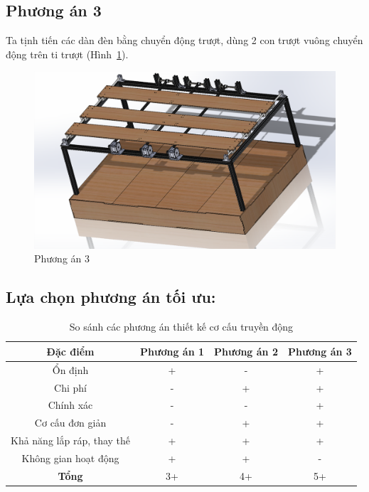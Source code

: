 \subsection{Phương án 3}
Ta tịnh tiến các dàn đèn bằng chuyển động trượt, dùng 2 con trượt vuông chuyển động trên ti trượt (Hình~\ref{fig:phuongan3}). 
\begin{center}
    \begin{figure}[htp]
    \begin{center}
     \includegraphics[scale=1]{Chapters/Chapter3/Images/Phuongan3}
    \end{center}
    \caption{Phương án 3}
    \label{fig:phuongan3}
    \end{figure}
\end{center}

\subsection{Lựa chọn phương án tối ưu:}

\begin{table}[H]
\centering
\begin{tabular}{|c|c|c|c|}
\hline 
Đặc điểm & Phương án 1 & Phương án 2 & Phương án 3 \\ 
\hline 
Ổn định & + & - & + \\ 
\hline 
Chi phí & - & + & + \\ 
\hline 
Chính xác & - & - & + \\ 
\hline 
Cơ cấu đơn giản & - & + & + \\ 
\hline 
Khả năng lắp ráp, thay thế & + & + & + \\ 
\hline 
Không gian hoạt động & + & + & - \\ 
\hline 
\textbf{Tổng} & 3+ & 4+ & 5+ \\ 
\hline 
\end{tabular} 
\caption{So sánh các phương án thiết kế cơ cấu truyền động}
\label{tab:sosanhcokhi}
\end{table}

